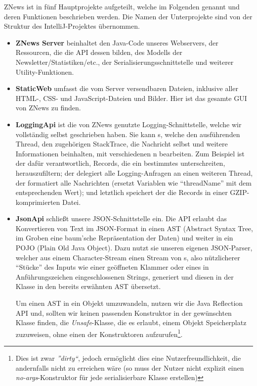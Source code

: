 ZNews ist in fünf Hauptprojekte aufgeteilt,
welche im Folgenden genannt und deren Funktionen beschrieben werden.
Die Namen der Unterprojekte sind von der Struktur des IntelliJ-Projektes übernommen.

\begin{itemize}
    \item \textbf{ZNews Server}
    beinhaltet den Java-Code unseres Webservers,
    der Ressourcen, die die API dessen bilden,
    des Modells der Newsletter/Statistiken/etc.,
    der Serialisierungsschnittstelle
    und weiterer Utility-Funktionen.

    \item \textbf{StaticWeb}
    umfasst die vom Server versendbaren Dateien,
    inklusive aller HTML-, CSS- und JavaScript-Dateien und Bilder.
    Hier ist das gesamte GUI von ZNews zu finden.

    \item \textbf{LoggingApi}
    ist die von ZNews genutzte Logging-Schnittstelle,
    welche wir vollständig selbst geschrieben haben.
    Sie kann s,
    welche den ausführenden Thread, den zugehörigen StackTrace,
    die Nachricht selbst und weitere Informationen beinhalten,
    mit verschiedenen n bearbeiten.
    Zum Beispiel ist der  dafür verantwortlich,
    Records, die ein bestimmtes  unterschreiten,
    herauszufiltern;
    der  delegiert alle Logging-Anfragen an einen weiteren Thread,
    der  formatiert alle Nachrichten
    (ersetzt Variablen wie ``{threadName}'' mit dem entsprechenden Wert);
    und letztlich speichert der  die Records in einer GZIP-komprimierten Datei.

    \item \textbf{JsonApi}
    schließt unsere JSON-Schnittstelle ein.
    Die API erlaubt das Konvertieren von Text im JSON-Format
    in einen AST (Abstract Syntax Tree, im Groben eine baum'sche Repräsentation der Daten)
    und weiter in ein POJO (Plain Old Java Object).
    Dazu nutzt sie unseren eigenen JSON-Parser,
    welcher aus einem Character-Stream einen Stream von s,
    also nützlicherer ``Stücke'' des Inputs
    wie einer geöffneten Klammer oder eines in Anführungszeichen eingeschlossenen Strings,
    generiert
    und diesen in der Klasse  in den bereits erwähnten AST übersetzt.

    Um einen AST in ein Objekt umzuwandeln,
    nutzen wir die Java Reflection API
    und, sollten wir keinen passenden Konstruktor in der gewünschten Klasse finden,
    die \emph{Unsafe}-Klasse, die es erlaubt,
    einem Objekt Speicherplatz zuzuweisen,
    ohne einen der Konstruktoren aufzurufen\footnote{%
    Dies ist zwar \emph{''dirty``},
    jedoch ermöglicht dies eine Nutzerfreundlichkeit,
    die andernfalls nicht zu erreichen wäre
    (so muss der Nutzer nicht explizit einen \emph{no-args}-Konstruktor für jede serialisierbare Klasse erstellen)}.


\end{itemize}

